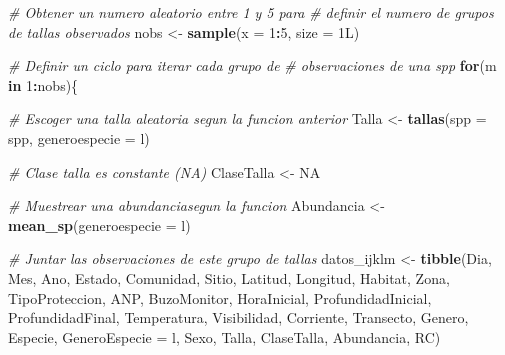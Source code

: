 \documentclass[]{krantz}
\newenvironment{Shaded}{\begin{snugshade}}{\end{snugshade}}
\newcommand{\CommentTok}[1]{\textcolor[rgb]{0.56,0.35,0.01}{\textit{#1}}}
\newcommand{\ControlFlowTok}[1]{\textcolor[rgb]{0.13,0.29,0.53}{\textbf{#1}}}
\newcommand{\DataTypeTok}[1]{\textcolor[rgb]{0.13,0.29,0.53}{#1}}
\newcommand{\DecValTok}[1]{\textcolor[rgb]{0.00,0.00,0.81}{#1}}
\newcommand{\KeywordTok}[1]{\textcolor[rgb]{0.13,0.29,0.53}{\textbf{#1}}}
\newcommand{\NormalTok}[1]{#1}
\newcommand{\OperatorTok}[1]{\textcolor[rgb]{0.81,0.36,0.00}{\textbf{#1}}}
\newcommand{\OtherTok}[1]{\textcolor[rgb]{0.56,0.35,0.01}{#1}}
\newcommand{\StringTok}[1]{\textcolor[rgb]{0.31,0.60,0.02}{#1}}
\begin{document}
\begin{Shaded}
\begin{Highlighting}[]
{        \CommentTok{# Obtener un numero aleatorio entre 1 y 5 para}
        \CommentTok{# definir el numero de grupos de tallas observados}
\NormalTok{        nobs <-}\StringTok{ }\KeywordTok{sample}\NormalTok{(}\DataTypeTok{x =} \DecValTok{1}\OperatorTok{:}\DecValTok{5}\NormalTok{, }\DataTypeTok{size =}\NormalTok{ 1L)}
        
        \CommentTok{# Definir un ciclo para iterar cada grupo de}
        \CommentTok{# observaciones de una spp}
        \ControlFlowTok{for}\NormalTok{(m }\ControlFlowTok{in} \DecValTok{1}\OperatorTok{:}\NormalTok{nobs)\{}
          
          \CommentTok{# Escoger una talla aleatoria segun la funcion anterior}
\NormalTok{          Talla <-}\StringTok{ }\KeywordTok{tallas}\NormalTok{(}\DataTypeTok{spp =}\NormalTok{ spp, }\DataTypeTok{generoespecie =}\NormalTok{ l)}
          
          \CommentTok{# Clase talla es constante (NA)}
\NormalTok{          ClaseTalla <-}\StringTok{ }\OtherTok{NA}
          
          \CommentTok{# Muestrear una abundanciasegun la funcion}
\NormalTok{          Abundancia <-}\StringTok{ }\KeywordTok{mean_sp}\NormalTok{(}\DataTypeTok{generoespecie =}\NormalTok{ l)}
          
          \CommentTok{# Juntar las observaciones de este grupo de tallas}
\NormalTok{          datos_ijklm <-}\StringTok{ }\KeywordTok{tibble}\NormalTok{(Dia,}
\NormalTok{                                Mes,}
\NormalTok{                                Ano,}
\NormalTok{                                Estado,}
\NormalTok{                                Comunidad,}
\NormalTok{                                Sitio,}
\NormalTok{                                Latitud,}
\NormalTok{                                Longitud,}
\NormalTok{                                Habitat,}
\NormalTok{                                Zona,}
\NormalTok{                                TipoProteccion,}
\NormalTok{                                ANP,}
\NormalTok{                                BuzoMonitor, }
\NormalTok{                                HoraInicial,}
\NormalTok{                                ProfundidadInicial,}
\NormalTok{                                ProfundidadFinal,}
\NormalTok{                                Temperatura,}
\NormalTok{                                Visibilidad,}
\NormalTok{                                Corriente,}
\NormalTok{                                Transecto,}
\NormalTok{                                Genero,}
\NormalTok{                                Especie,}
                                \DataTypeTok{GeneroEspecie =}\NormalTok{ l,}
\NormalTok{                                Sexo,}
\NormalTok{                                Talla,}
\NormalTok{                                ClaseTalla,}
\NormalTok{                                Abundancia,}
\NormalTok{                                RC)}
          
}
\end{Highlighting}
\end{Shaded}
\end{document}
